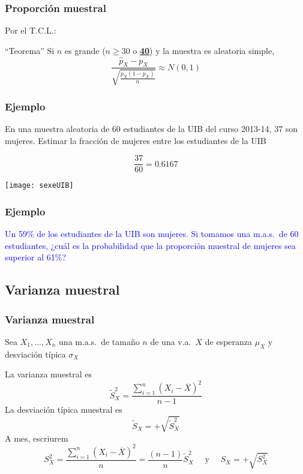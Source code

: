 \documentclass[12pt,t]{beamer}\usepackage[]{graphicx}\usepackage[]{color}
\newcommand{\blue}[1]{\textcolor{blue}{#1}}
\renewcommand{\emph}[1]{{\color{red}#1}}
\renewcommand{\geq}{\geqslant}
\theoremstyle{plain}
\theoremstyle{definition}
\begin{document}
\begin{frame}
\frametitle{Proporción  muestral}
\vspace*{-2ex}

Por el  T.C.L.:

\begin{block}{``Teorema''}
Si $n$ es grande (\emph{$n\geq 30$ o \underline{\textbf{40}}}) y la muestra es aleatoria simple, 
$$
\frac{\widehat{p}_X-p_X}{\sqrt{\frac{{p}_X(1-{p}_X)}{n}}}\approx N(0,1)
$$
\end{block}

\end{frame}


\begin{frame}
\frametitle{Ejemplo}
\vspace*{-2ex}

En una muestra aleatoria de 60 estudiantes de la UIB del curso 2013-14, 37 son mujeres. Estimar la fracción de mujeres entre los estudiantes de la UIB
\medskip

$$
\frac{37}{60}=0.6167
$$
\vspace*{-2ex}

\begin{center}
\texttt{[image: sexeUIB]}
\end{center}


\end{frame}


\begin{frame}
\frametitle{Ejemplo}
\vspace*{-2ex}

\blue{Un  59\% de los estudiantes de la UIB son  mujeres. Si tomamos una m.a.s.\ de 60 estudiantes, ¿cuál es la probabilidad que la proporción muestral de mujeres sea superior al 61\%?}
\medskip 


   
\end{frame}


\subsection{Varianza muestral}

\begin{frame}
\frametitle{Varianza muestral}

Sea $X_1,\ldots, X_n$ una m.a.s.\ de tamaño $n$ de una v.a.\ $X$ de esperanza $\mu_X$ y desviación típica $\sigma_X$
\medskip

La \emph{varianza muestral} es
$$
\widetilde{S}_{X}^2=\frac{\sum_{i=1}^n (X_{i}-\overline{X})^2}{n-1}
$$
La \emph{desviación típica muestral} es 
$$
\widetilde{S}_{X}=+\sqrt{\widetilde{S}_{X}^2}
$$
A mes, escriurem
$$
S^2_{X}=\frac{\sum_{i=1}^n (X_{i}-\overline{X})^2}{n}=\frac{(n-1)}{n}\widetilde{S}^2_{X}\quad\mbox{ y }\quad S_X=+\sqrt{S_X^2}
$$
\end{frame}
\end{document}
